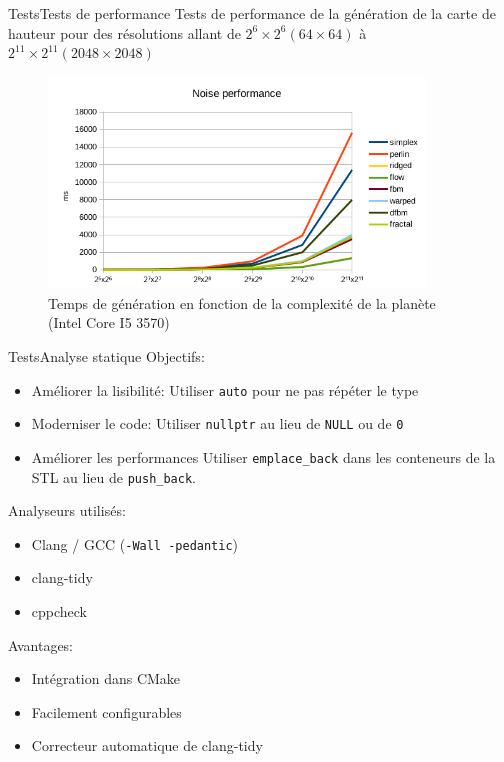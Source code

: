   \begin{frame}{Tests}{Tests de performance}
    Tests de performance de la génération de la carte de hauteur pour
    des résolutions allant de $2^6\times2^6 (64\times64)$ à
    $2^{11}\times2^{11} (2048\times2048)$
    \begin{figure}[!ht]
      \centering
      \includegraphics[width=10cm]{img/bench_i53570_fixed.png}
      \caption{Temps de génération en fonction de la complexité de la
      planète (Intel Core I5 3570)}
      \label{fig:bench}
    \end{figure}
  \end{frame}


  \begin{frame}{Tests}{Analyse statique}
    Objectifs:
    \begin{itemize}
      \item Améliorer la lisibilité:
        Utiliser \texttt{auto} pour ne pas répéter le type
      \item Moderniser le code:
        Utiliser \texttt{nullptr} au lieu de \texttt{NULL} ou de
        \texttt{0}
      \item Améliorer les performances
        Utiliser \texttt{emplace\_back} dans les conteneurs de la STL au
        lieu de \texttt{push\_back}.
    \end{itemize}
    Analyseurs utilisés:
    \begin{itemize}
      \item Clang / GCC (\texttt{-Wall -pedantic})
      \item clang-tidy
      \item cppcheck
    \end{itemize}
    Avantages:
    \begin{itemize}
      \item Intégration dans CMake
      \item Facilement configurables
      \item Correcteur automatique de clang-tidy
    \end{itemize}
  \end{frame}

